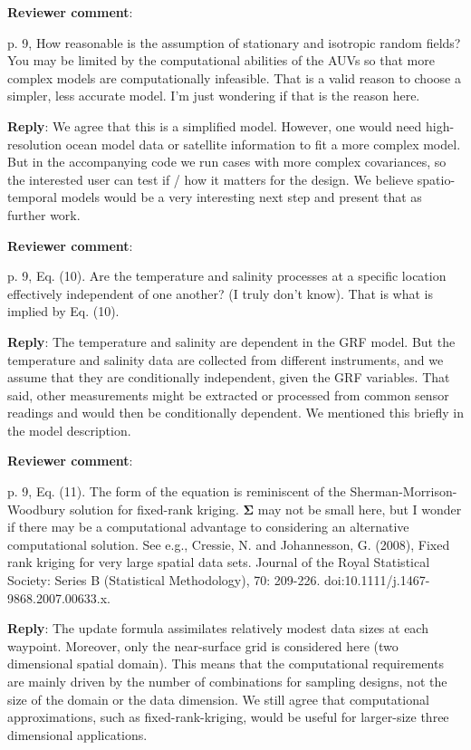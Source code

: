 \documentclass[a4paper]{article}
\newcommand{\bSigma}{ {\boldsymbol \Sigma} }
\def\revcom{\textbf{Reviewer comment}}
\def\reply{\textbf{Reply}}
\begin{document}
\begin{answers}
\item{\revcom :}\label{r2c3}

p. 9, How reasonable is the assumption of stationary and isotropic random fields? You may be limited by the computational abilities of the AUVs so that more complex models are computationally infeasible. That is a valid reason to choose a simpler, less accurate model. I’m just wondering if that is the reason here. 

\reply: We agree that this is a simplified model. However, one would need high-resolution ocean model data or satellite information to fit a more complex model. But in the accompanying code we run cases with more complex covariances, so the interested user can test if / how it matters for the design. We believe spatio-temporal models would be a very interesting next step and present that as further work.

\item{\revcom  :}\label{r2c4}

p. 9, Eq. (10). Are the temperature and salinity processes at a specific location effectively independent of one another? (I truly don’t know). That is what is implied by Eq. (10).

\reply: The temperature and salinity are dependent in the GRF model. But the temperature and salinity data are collected from different instruments, and we assume that they are conditionally independent, given the GRF variables. That said, other measurements might be extracted or processed from common sensor readings and would then be conditionally dependent. We mentioned this briefly in the model description.

\item{\revcom :}\label{r2c5}

p. 9, Eq. (11). The form of the equation is reminiscent of the Sherman-Morrison-Woodbury solution for fixed-rank kriging. $\bSigma$ may not be small here, but I wonder if there may be a computational advantage to considering an alternative computational solution.  See e.g., Cressie, N. and Johannesson, G. (2008), Fixed rank kriging for very large spatial data sets. Journal of the Royal Statistical Society: Series B (Statistical Methodology), 70: 209-226. doi:10.1111/j.1467-9868.2007.00633.x.

\reply: The update formula assimilates relatively modest data sizes at each waypoint. Moreover, only the near-surface grid is considered here (two dimensional spatial domain). This means that the computational requirements are mainly driven by the number of combinations for sampling designs, not the size of the domain or the data dimension. 
We still agree that computational approximations, such as fixed-rank-kriging, would be useful for larger-size three dimensional applications. 


\end{answers}
\end{document}
